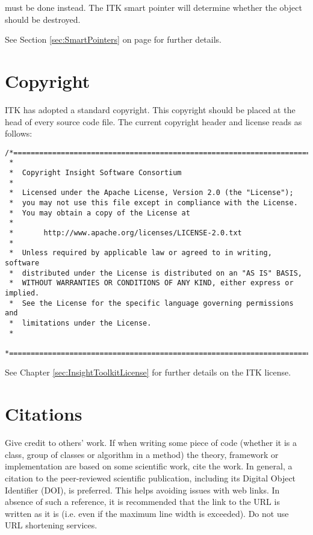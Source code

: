 must be done instead. The ITK smart pointer will determine whether the object
should be destroyed.

See Section \ref{sec:SmartPointers} on page \pageref{sec:SmartPointers} for
further details.


\section{Copyright}
\label{sec:Copyright}

ITK has adopted a standard copyright. This copyright should be placed at the
head of every source code file. The current copyright header and license reads
as follows:

\small
\begin{verbatim}
/*=========================================================================
 *
 *  Copyright Insight Software Consortium
 *
 *  Licensed under the Apache License, Version 2.0 (the "License");
 *  you may not use this file except in compliance with the License.
 *  You may obtain a copy of the License at
 *
 *       http://www.apache.org/licenses/LICENSE-2.0.txt
 *
 *  Unless required by applicable law or agreed to in writing, software
 *  distributed under the License is distributed on an "AS IS" BASIS,
 *  WITHOUT WARRANTIES OR CONDITIONS OF ANY KIND, either express or implied.
 *  See the License for the specific language governing permissions and
 *  limitations under the License.
 *
 *=========================================================================*/
\end{verbatim}
\normalsize

See Chapter \ref{sec:InsightToolkitLicense} for further details on the ITK
license.


\section{Citations}
\label{sec:Citations}

Give credit to others' work. If when writing some piece of code (whether it is a
class, group of classes or algorithm in a method) the theory, framework or
implementation are based on some scientific work, cite the work. In general, a
citation to the peer-reviewed scientific publication, including its Digital
Object Identifier (DOI), is preferred. This helps avoiding issues with web
links. In absence of such a reference, it is recommended that the link to the
URL is written as it is (i.e. even if the maximum line width is exceeded). Do
not use URL shortening services.

